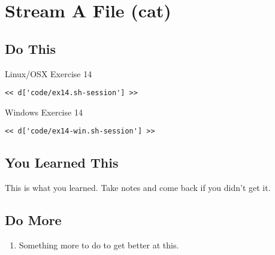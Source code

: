 \chapter{Stream A File (cat)}

\section{Do This}

\begin{code}{Linux/OSX Exercise 14}
\begin{Verbatim}
<< d['code/ex14.sh-session'] >>
\end{Verbatim}
\end{code}

\begin{code}{Windows Exercise 14}
\begin{Verbatim}
<< d['code/ex14-win.sh-session'] >>
\end{Verbatim}
\end{code}

\section{You Learned This}

This is what you learned.  Take notes and come back if you didn't get it.

\section{Do More}

\begin{enumerate}
\item Something more to do to get better at this.
\end{enumerate}

